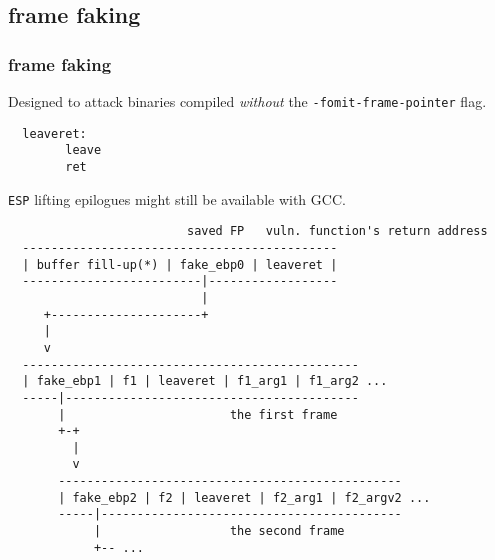 \documentclass[10pt]{beamer}
\begin{document}
\begin{frame}
\begin{columns}[c]
  \end{columns}
\end{frame}

\subsection{frame faking}

\begin{frame}[fragile]
  \frametitle{frame faking}
  Designed to attack binaries compiled \emph{without} the
  \texttt{-fomit-frame-pointer} flag.

  \begin{lstlisting}
  leaveret:
        leave
        ret
  \end{lstlisting}

  \texttt{ESP} lifting epilogues might still be available with GCC.
\end{frame}

\begin{frame}[fragile]
  \begin{lstlisting}
                         saved FP   vuln. function's return address
  --------------------------------------------
  | buffer fill-up(*) | fake_ebp0 | leaveret |
  -------------------------|------------------
                           |
     +---------------------+
     |
     v
  -----------------------------------------------
  | fake_ebp1 | f1 | leaveret | f1_arg1 | f1_arg2 ...
  -----|-----------------------------------------
       |                       the first frame
       +-+
         |
         v
       ------------------------------------------------
       | fake_ebp2 | f2 | leaveret | f2_arg1 | f2_argv2 ...
       -----|------------------------------------------
            |                  the second frame
            +-- ...
  \end{lstlisting}
\end{frame}
\end{document}
